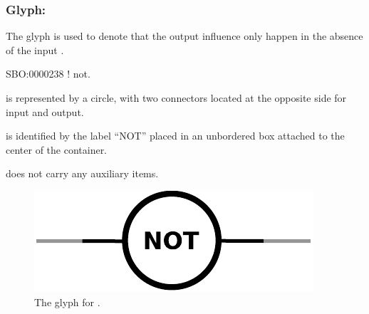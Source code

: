 \color{blue}
\subsubsection{Glyph: }\label{sec:not}

The glyph  is used to denote that the output influence only happen in the absence of the input .

\begin{glyphDescription}

 \glyphSboTerm SBO:0000238 ! not.

 \glyphContainer {} is represented by a circle, with two connectors located at the opposite side for input and output.

  \glyphLabel {} is identified by the label ``NOT'' placed in an unbordered box attached to the center of the container. 

  \glyphAux {} does not carry any auxiliary items.

\end{glyphDescription}

\begin{figure}[H]
  \centering
  \includegraphics[scale = 0.5]{images/not}
  \caption{The \ER glyph for .}
  \label{fig:not}
\end{figure}

